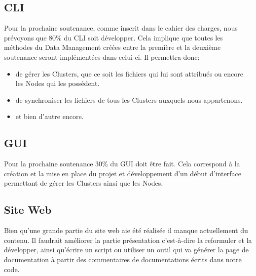 \documentclass[11pt, a4paper]{report}
\begin{document}
    \subsection{CLI}
      Pour la prochaine soutenance, comme inscrit dans le cahier des charges, nous prévoyons que 80\% du CLI soit développer. Cela implique que toutes les méthodes du Data Management créées entre la première et la deuxième soutenance seront implémentées dans celui-ci. Il permettra donc:
      \begin{itemize}
          \item de gérer les Clusters, que ce soit les fichiers qui lui sont attribués ou encore les Nodes qui les possèdent.
          \item de synchroniser les fichiers de tous les Clusters auxquels nous appartenons.
          \item et bien d'autre encore.
      \end{itemize}
    
    \subsection{GUI}
      Pour la prochaine soutenance 30\% du GUI doit être fait. Cela correspond à la création et la mise en place du projet et développement d'un début d'interface permettant de gérer les Clusters ainsi que les Nodes.
    
    \subsection{Site Web}
      Bien qu'une grande partie du site web aie été réalisée il manque actuellement du contenu. Il faudrait améliorer la partie présentation c'est-à-dire la reformuler et la développer, ainsi qu'écrire un script ou utiliser un outil qui va générer la page de documentation à partir des commentaires de documentations écrits dans notre code.
    
    \clearpage
\end{document}

